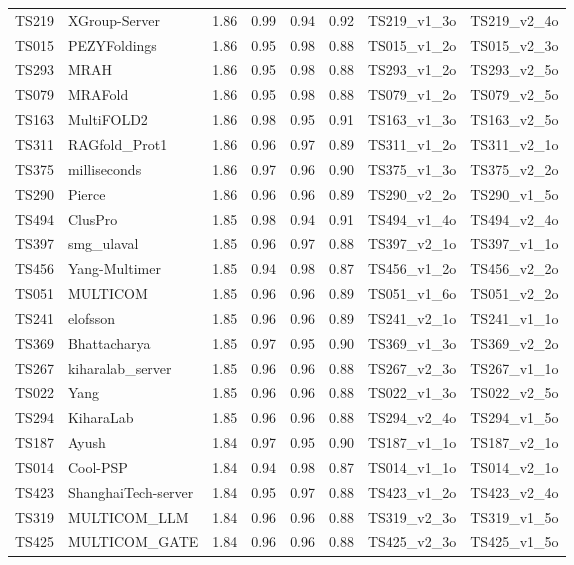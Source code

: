 \begin{longtable}{llllllll}
TS219 & XGroup-Server & 1.86 & 0.99 & 0.94 & 0.92 & TS219\_v1\_3o & TS219\_v2\_4o \\ 
TS015 & PEZYFoldings & 1.86 & 0.95 & 0.98 & 0.88 & TS015\_v1\_2o & TS015\_v2\_3o \\ 
TS293 & MRAH & 1.86 & 0.95 & 0.98 & 0.88 & TS293\_v1\_2o & TS293\_v2\_5o \\ 
TS079 & MRAFold & 1.86 & 0.95 & 0.98 & 0.88 & TS079\_v1\_2o & TS079\_v2\_5o \\ 
TS163 & MultiFOLD2 & 1.86 & 0.98 & 0.95 & 0.91 & TS163\_v1\_3o & TS163\_v2\_5o \\ 
TS311 & RAGfold\_Prot1 & 1.86 & 0.96 & 0.97 & 0.89 & TS311\_v1\_2o & TS311\_v2\_1o \\ 
TS375 & milliseconds & 1.86 & 0.97 & 0.96 & 0.90 & TS375\_v1\_3o & TS375\_v2\_2o \\ 
TS290 & Pierce & 1.86 & 0.96 & 0.96 & 0.89 & TS290\_v2\_2o & TS290\_v1\_5o \\ 
TS494 & ClusPro & 1.85 & 0.98 & 0.94 & 0.91 & TS494\_v1\_4o & TS494\_v2\_4o \\ 
TS397 & smg\_ulaval & 1.85 & 0.96 & 0.97 & 0.88 & TS397\_v2\_1o & TS397\_v1\_1o \\ 
TS456 & Yang-Multimer & 1.85 & 0.94 & 0.98 & 0.87 & TS456\_v1\_2o & TS456\_v2\_2o \\ 
TS051 & MULTICOM & 1.85 & 0.96 & 0.96 & 0.89 & TS051\_v1\_6o & TS051\_v2\_2o \\ 
TS241 & elofsson & 1.85 & 0.96 & 0.96 & 0.89 & TS241\_v2\_1o & TS241\_v1\_1o \\ 
TS369 & Bhattacharya & 1.85 & 0.97 & 0.95 & 0.90 & TS369\_v1\_3o & TS369\_v2\_2o \\ 
TS267 & kiharalab\_server & 1.85 & 0.96 & 0.96 & 0.88 & TS267\_v2\_3o & TS267\_v1\_1o \\ 
TS022 & Yang & 1.85 & 0.96 & 0.96 & 0.88 & TS022\_v1\_3o & TS022\_v2\_5o \\ 
TS294 & KiharaLab & 1.85 & 0.96 & 0.96 & 0.88 & TS294\_v2\_4o & TS294\_v1\_5o \\ 
TS187 & Ayush & 1.84 & 0.97 & 0.95 & 0.90 & TS187\_v1\_1o & TS187\_v2\_1o \\ 
TS014 & Cool-PSP & 1.84 & 0.94 & 0.98 & 0.87 & TS014\_v1\_1o & TS014\_v2\_1o \\ 
TS423 & ShanghaiTech-server & 1.84 & 0.95 & 0.97 & 0.88 & TS423\_v1\_2o & TS423\_v2\_4o \\ 
TS319 & MULTICOM\_LLM & 1.84 & 0.96 & 0.96 & 0.88 & TS319\_v2\_3o & TS319\_v1\_5o \\ 
TS425 & MULTICOM\_GATE & 1.84 & 0.96 & 0.96 & 0.88 & TS425\_v2\_3o & TS425\_v1\_5o \\ 

\end{longtable}
